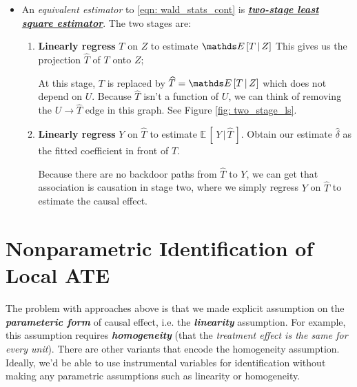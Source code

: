 \documentclass[11pt]{article}
\begin{document}
\begin{itemize}
\item An \emph{equivalent estimator} to \eqref{eqn: wald_stats_cont} is \underline{\emph{\textbf{two-stage least square estimator}}}. The two stages are: 
\begin{enumerate}
\item \textbf{Linearly regress} $T$ on $Z$ to estimate $\E{}{T\,|\,Z}$ This gives us the projection $\widehat{T}$ of $T$ onto $Z$; 

At this stage, $T$ is replaced by $\widehat{T}= \E{}{T\,|\,Z}$ which does not depend on $U$. Because $\widehat{T}$ isn't a function of  $U$, we can think of removing the $U \rightarrow \widehat{T}$ edge in this graph. See Figure \ref{fig: two_stage_ls}. 

\item \textbf{Linearly regress} $Y$ on $\widehat{T}$ to estimate $\mathds{E}\,[\,Y\,|\,\widehat{T}\,]$. Obtain our estimate $\hat{\delta}$
as the fitted coefficient in front of $\widehat{T}$.

Because there are no backdoor paths from $\widehat{T}$ to $Y$, we can get that association is causation in stage two, where we simply regress $Y$ on $\widehat{T}$ to estimate the causal effect.
\end{enumerate}
\end{itemize}

\section{Nonparametric Identification of Local ATE}
The problem with approaches above is that we made explicit assumption on the \emph{\textbf{parameteric form}} of causal effect, i.e. the \emph{\textbf{linearity}} assumption. For example, this assumption requires \textit{\textbf{homogeneity}} (that the \emph{treatment effect is the same for every unit}). There are other variants that encode the homogeneity assumption. Ideally, we’d be able to use instrumental variables for identification without making any parametric assumptions such as linearity or homogeneity. 
\end{document}
